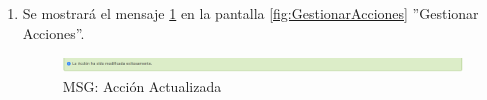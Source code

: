 \begin{enumerate}
			\item Se mostrará el mensaje \ref{fig:accionModificada} en la pantalla \ref{fig:GestionarAcciones} ''Gestionar Acciones''.
			
			\begin{figure}[htbp!]
				\begin{center}
					\includegraphics[scale=0.5]{roles/lider/pantallas/acciones/pantallas/IU11-1-1-2MSG1}
					\caption{MSG: Acción Actualizada}
					\label{fig:accionModificada}
				\end{center}
			\end{figure}
			\end{enumerate}